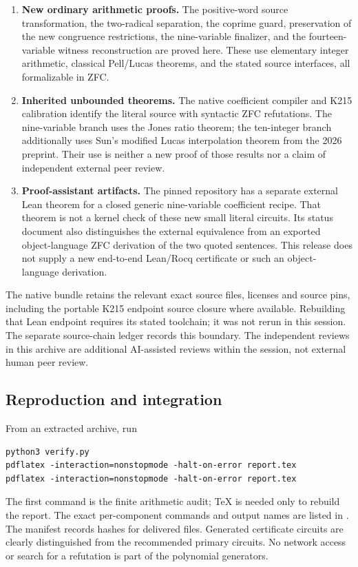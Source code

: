\documentclass[11pt,a4paper]{article}
\theoremstyle{definition}\newtheorem{definition}[theorem]{Definition}
\theoremstyle{remark}\newtheorem{remark}[theorem]{Remark}
\newcommand{\code}[1]{\texttt{\small\detokenize{#1}}}
\begin{document}
\begin{enumerate}
\item \textbf{New ordinary arithmetic proofs.} The positive-word source
  transformation, the two-radical separation, the coprime guard, preservation
  of the new congruence restrictions, the nine-variable finalizer, and the
  fourteen-variable witness reconstruction are proved here. These use
  elementary integer arithmetic, classical Pell/Lucas theorems, and the
  stated source interfaces, all formalizable in ZFC.
\item \textbf{Inherited unbounded theorems.} The native coefficient compiler
  and K215 calibration identify the literal source with syntactic ZFC
  refutations. The nine-variable branch uses the Jones ratio theorem; the
  ten-integer branch additionally uses Sun's modified Lucas interpolation
  theorem from the 2026 preprint. Their use is neither a new proof of those
  results nor a claim of independent external peer review.
\item \textbf{Proof-assistant artifacts.} The pinned repository has a
  separate external Lean theorem for a closed generic nine-variable
  coefficient recipe. That theorem is not a kernel check of these new
  small literal circuits. Its status document also distinguishes the
  external equivalence from an exported object-language ZFC derivation of
  the two quoted sentences. This release does not supply a new end-to-end
  Lean/Rocq certificate or such an object-language derivation.
\end{enumerate}

The native bundle retains the relevant exact source files, licenses and
source pins, including the portable K215 endpoint source closure where
available. Rebuilding that Lean endpoint requires its stated toolchain;
it was not rerun in this session. The separate source-chain ledger records
this boundary. The independent reviews in this archive are additional
AI-assisted reviews within the session, not external human peer review.

\subsection{Reproduction and integration}

From an extracted archive, run
\begin{verbatim}
python3 verify.py
pdflatex -interaction=nonstopmode -halt-on-error report.tex
pdflatex -interaction=nonstopmode -halt-on-error report.tex
\end{verbatim}
The first command is the finite arithmetic audit; TeX is needed only to
rebuild the report. The exact per-component commands and output names are
listed in \code{README.md}. The manifest records hashes for delivered
files. Generated certificate circuits are clearly distinguished from the
recommended primary circuits. No network access or search for a refutation
is part of the polynomial generators.
\end{document}
